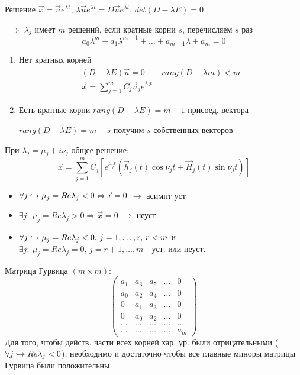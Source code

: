 \documentclass{article}
\begin{document}
Решение $\vec{x}=\vec{u}e^{\lambda t}$, $\lambda \vec{u}e^{\lambda t}=D\vec{u}e^{\lambda t}$, $det(D-\lambda E)=0$

$\implies$ $\lambda_j$ имеет $m$ решений, если кратные корни $s$, перечисляем $s$ раз
\[
  a_0 \lambda^{m}+a_1 \lambda^{m-1} + \dots + a_{m-1}\lambda + a_m=0
\]
\begin{enumerate}
  \item Нет кратных корней
    \begin{gather*}
      (D-\lambda E)\vec{u}=0 \qquad rang(D-\lambda m) < m \\ 
      \vec{x}=\sum_{j=1}^{m}C_j \vec{u}_j e^{\lambda_j t}
    \end{gather*}
  \item Есть кратные корни
    $rang(D-\lambda E)=m-1$ присоед. вектора

    $rang(D-\lambda E)=m-s$ получим $s$ собственных векторов
\end{enumerate}
При $\lambda_j=\mu_j + i\nu_j$ общее решение:
\[
  \vec{x}=\sum_{j=1}^{m}C_j[e^{\mu_j t}(\vec{h}_j(t)\cos \nu_j t + \vec{H}_j(t)\sin \nu_j t)]
\]
\begin{itemize}
  \item $\forall j \hookrightarrow \mu_j=Re \lambda_j <0 \Leftrightarrow \vec{x}=0$ $\rightarrow$ асимпт уст
  \item $\exists j: \: \mu_j=Re \lambda_j >0 \Rightarrow \vec{x}=0$ $\rightarrow$ неуст.
  \item $\forall j \hookrightarrow \mu_j=Re \lambda_j <0, \, j=1,\dots ,r, \, r<m$ и $\exists j: \: \mu_j=Re \lambda_j=0, \, j=r+1,\dots ,m$
    - уст. или неуст.
\end{itemize}
\begin{theorem}
  \phantom{.}

  Матрица Гурвица $(m\times m)$:
  \[
    \begin{pmatrix}
      a_1 & a_3 & a_5 & \dots & 0 \\ 
      a_0 & a_2 & a_4 & \dots & 0 \\
      0 & a_1 & a_3 & \dots & 0 \\ 
      0 & a_0 & a_2 & \dots & 0 \\
      \dots & \dots  &\dots &\dots &\dots \\ 
      \dots & \dots &\dots &\dots & a_m
    \end{pmatrix}
  \]
  Для того, чтобы действ. части всех корней хар. ур. были отрицательными
  ($\forall j \hookrightarrow Re\lambda_j<0$), необходимо и достаточно чтобы все
  главные миноры матрицы Гурвица были положительны.
\end{theorem}
\end{document}
